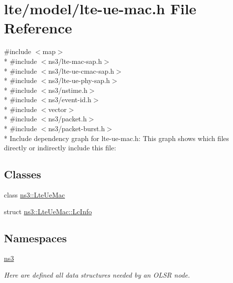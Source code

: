 \hypertarget{lte-ue-mac_8h}{}\section{lte/model/lte-\/ue-\/mac.h File Reference}
\label{lte-ue-mac_8h}
{\ttfamily \#include $<$map$>$}\\*
{\ttfamily \#include $<$ns3/lte-\/mac-\/sap.\+h$>$}\\*
{\ttfamily \#include $<$ns3/lte-\/ue-\/cmac-\/sap.\+h$>$}\\*
{\ttfamily \#include $<$ns3/lte-\/ue-\/phy-\/sap.\+h$>$}\\*
{\ttfamily \#include $<$ns3/nstime.\+h$>$}\\*
{\ttfamily \#include $<$ns3/event-\/id.\+h$>$}\\*
{\ttfamily \#include $<$vector$>$}\\*
{\ttfamily \#include $<$ns3/packet.\+h$>$}\\*
{\ttfamily \#include $<$ns3/packet-\/burst.\+h$>$}\\*
Include dependency graph for lte-\/ue-\/mac.h\+:
This graph shows which files directly or indirectly include this file\+:
\subsection*{Classes}
\begin{DoxyCompactItemize}
\item 
class \hyperlink{classns3_1_1LteUeMac}{ns3\+::\+Lte\+Ue\+Mac}
\item 
struct \hyperlink{structns3_1_1LteUeMac_1_1LcInfo}{ns3\+::\+Lte\+Ue\+Mac\+::\+Lc\+Info}
\end{DoxyCompactItemize}
\subsection*{Namespaces}
\begin{DoxyCompactItemize}
\item 
 \hyperlink{namespacens3}{ns3}
\begin{DoxyCompactList}\small\item\em Here are defined all data structures needed by an O\+L\+SR node. \end{DoxyCompactList}\end{DoxyCompactItemize}
